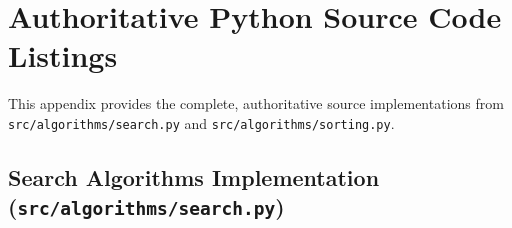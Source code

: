 \documentclass[11pt,a4paper,oneside]{report}
\theoremstyle{definition}
\begin{document}
\appendix

\chapter{Authoritative Python Source Code Listings}
\label{app:code}

This appendix provides the complete, authoritative source implementations from \texttt{src/algorithms/search.py} and \texttt{src/algorithms/sorting.py}.

\section{Search Algorithms Implementation (\texttt{src/algorithms/search.py})}
\end{document}
